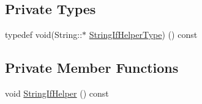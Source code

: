 \subsection*{Private Types}
\begin{DoxyCompactItemize}
\item 
typedef void(String\+::$\ast$ \hyperlink{class_string_a2f31c4cd9dab650141b50a8350a1ffd4}{String\+If\+Helper\+Type}) () const
\end{DoxyCompactItemize}
\subsection*{Private Member Functions}
\begin{DoxyCompactItemize}
\item 
void \hyperlink{class_string_a7587eade7e0df22dca2c424df32198de}{String\+If\+Helper} () const
\end{DoxyCompactItemize}
